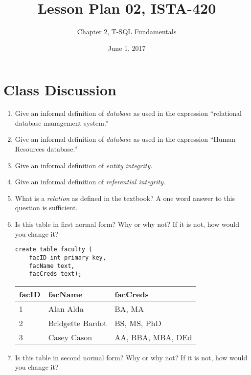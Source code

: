 \documentclass{article}
\title{Lesson Plan 02, ISTA-420}
\author{Chapter 2, T-SQL Fundamentals}
\date{June 1, 2017}
\begin{document}
    

    \maketitle{}

    \section{Class Discussion}
    \begin{enumerate}

        \item Give an informal definition of \textit{database} as used in the expression ``relational database management system.''


        \item Give an informal definition of \textit{database} as used in the expression ``Human Resources database.''


        \item Give an informal definition of \textit{entity integrity}.


        \item Give an informal definition of \textit{referential integrity}.


        \item What is a \textit{relation} as defined in the textbook? A one word answer to this question is sufficient.


        \item Is this table in first normal form? Why or why not? If it is not, how would you change it?

            \begin{verbatim}
create table faculty (
    facID int primary key,
    facName text,
    facCreds text);
            \end{verbatim}

            \begin{tabular}{| l | l | l |}
\hline
\textbf{facID} & \textbf{facName} & \textbf{facCreds} \\
\hline
1 & Alan Alda & BA, MA \\
\hline
2 & Bridgette Bardot & BS, MS, PhD \\
\hline
3 & Casey Cason & AA, BBA, MBA, DEd \\
\hline

            \end{tabular}

        \item Is this table in second normal form? Why or why not? If it is not, how would you change it?


\end{enumerate}
\end{document}
